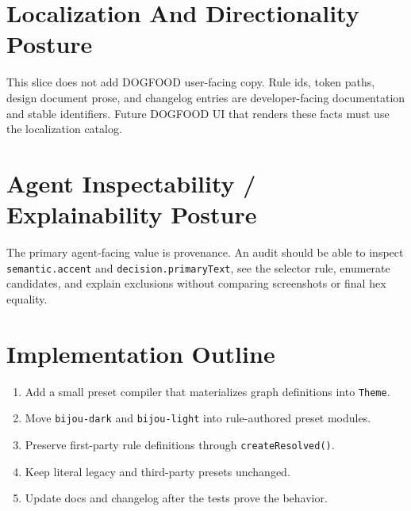\section{Localization And Directionality Posture}\label{record-185-localization-and-directionality-posture}

This slice does not add DOGFOOD user-facing copy. Rule ids, token paths, design document prose, and changelog entries are developer-facing documentation and stable identifiers. Future DOGFOOD UI that renders these facts must use the localization catalog.

\section{Agent Inspectability / Explainability Posture}\label{record-185-agent-inspectability-explainability-posture}

The primary agent-facing value is provenance. An audit should be able to inspect \texttt{s\allowbreak{}e\allowbreak{}m\allowbreak{}a\allowbreak{}n\allowbreak{}t\allowbreak{}i\allowbreak{}c\allowbreak{}.\allowbreak{}a\allowbreak{}c\allowbreak{}c\allowbreak{}e\allowbreak{}n\allowbreak{}t} and \texttt{d\allowbreak{}e\allowbreak{}c\allowbreak{}i\allowbreak{}s\allowbreak{}i\allowbreak{}o\allowbreak{}n\allowbreak{}.\allowbreak{}p\allowbreak{}r\allowbreak{}i\allowbreak{}m\allowbreak{}a\allowbreak{}r\allowbreak{}y\allowbreak{}T\allowbreak{}e\allowbreak{}x\allowbreak{}t}, see the selector rule, enumerate candidates, and explain exclusions without comparing screenshots or final hex equality.

\section{Implementation Outline}\label{record-185-implementation-outline}

\begin{enumerate}
\def\labelenumi{\arabic{enumi}.}
\tightlist
\item
  Add a small preset compiler that materializes graph definitions into \texttt{T\allowbreak{}h\allowbreak{}e\allowbreak{}m\allowbreak{}e}.
\item
  Move \texttt{b\allowbreak{}i\allowbreak{}j\allowbreak{}o\allowbreak{}u\allowbreak{}-\allowbreak{}d\allowbreak{}a\allowbreak{}r\allowbreak{}k} and \texttt{b\allowbreak{}i\allowbreak{}j\allowbreak{}o\allowbreak{}u\allowbreak{}-\allowbreak{}l\allowbreak{}i\allowbreak{}g\allowbreak{}h\allowbreak{}t} into rule-authored preset modules.
\item
  Preserve first-party rule definitions through \texttt{c\allowbreak{}r\allowbreak{}e\allowbreak{}a\allowbreak{}t\allowbreak{}e\allowbreak{}R\allowbreak{}e\allowbreak{}s\allowbreak{}o\allowbreak{}l\allowbreak{}v\allowbreak{}e\allowbreak{}d\allowbreak{}(\allowbreak{})}.
\item
  Keep literal legacy and third-party presets unchanged.
\item
  Update docs and changelog after the tests prove the behavior.
\end{enumerate}

